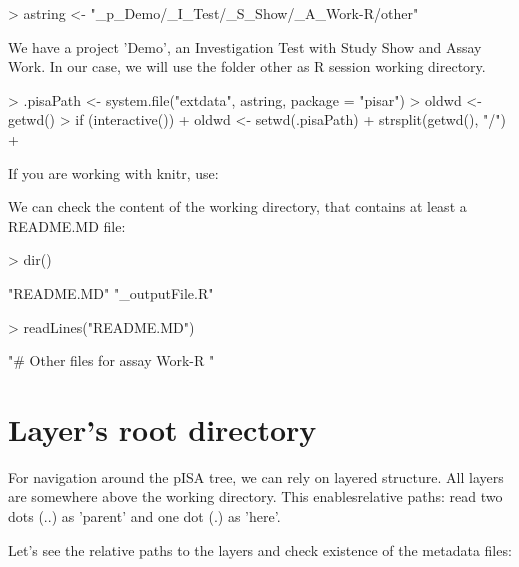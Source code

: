\documentclass[a4paper,12pt]{article}\usepackage[]{graphicx}\usepackage[]{color}
\makeatletter
\providecommand\code{\bgroup\@codex}
\def\@codex#1{{\normalfont\ttfamily\hyphenchar\font=-1  #1}\egroup}
\providecommand{\file}{\code}
\makeatother
\begin{document}
\begin{Schunk}
\begin{Sinput}
> astring <- "_p_Demo/_I_Test/_S_Show/_A_Work-R/other"
\end{Sinput}
\end{Schunk}

We have a project \code{'Demo'}, an Investigation \code{Test} with Study \code{Show}  and Assay \code{Work}. In our case, we will use the folder \file{other} as R session working directory.

\begin{Schunk}
\begin{Sinput}
> .pisaPath <- system.file("extdata", astring, package = "pisar")
> oldwd <- getwd()
> if (interactive()) {
+     oldwd <- setwd(.pisaPath)
+     strsplit(getwd(), "/")
+ }
\end{Sinput}
\end{Schunk}

If you are working with knitr, use:
\begin{Schunk}
\end{Schunk}

We can check the content of the working directory, that contains at least a \file{README.MD} file:
\begin{Schunk}
\begin{Sinput}
> dir()
\end{Sinput}
\begin{Soutput}
[1] "README.MD"     "_outputFile.R"
\end{Soutput}
\begin{Sinput}
> readLines("README.MD")
\end{Sinput}
\begin{Soutput}
[1] "# Other files for assay Work-R "
\end{Soutput}
\end{Schunk}

\section{Layer's root directory}

For navigation around the pISA tree, we can rely on layered structure. All layers are somewhere above the working directory. This enablesrelative paths: read two dots (..) as 'parent' and one dot (.) as 'here'.

Let's see the relative paths to the layers and check existence of the metadata files:
\end{document}
